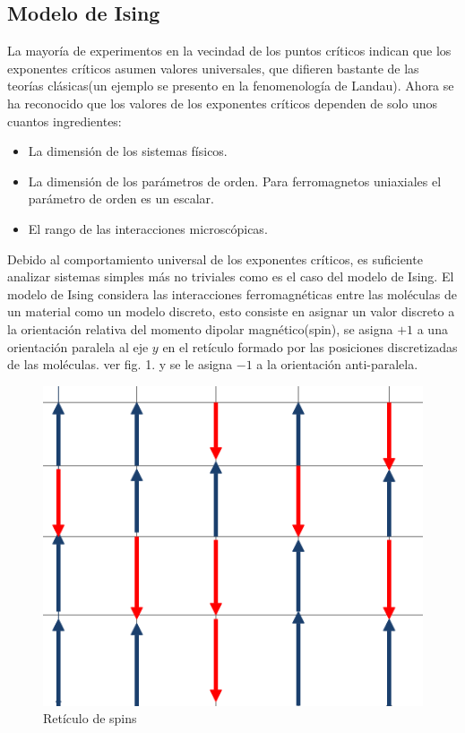 \documentclass[a4paper]{article}
\begin{document}
\subsection{Modelo de Ising}
La mayoría de experimentos en la vecindad de los puntos críticos indican que los exponentes críticos asumen valores universales, que difieren bastante de las teorías clásicas(un ejemplo se presento en la fenomenología de Landau). Ahora se ha reconocido que los valores de los exponentes críticos dependen de solo unos cuantos ingredientes:
\begin{itemize}
\item La dimensión de los sistemas físicos.
\item La dimensión de los parámetros de orden. Para ferromagnetos uniaxiales el parámetro de orden es un escalar.
\item El rango de las interacciones microscópicas.
\end{itemize}
Debido al comportamiento universal de los exponentes críticos, es suficiente analizar sistemas simples más no triviales como es el caso del modelo de Ising. El modelo de Ising considera las interacciones ferromagnéticas entre las moléculas de un material como un modelo discreto, esto consiste en asignar un valor discreto a la orientación relativa del momento dipolar magnético(spin), se asigna $+1$ a una orientación paralela al eje $y$ en el retículo formado por las posiciones discretizadas de las moléculas. ver fig. 1. y se le asigna $-1$ a la orientación anti-paralela. 

\begin{figure}[H]
\begin{center}
\includegraphics[scale=0.4]{LatticeIsing.png} 
\end{center} 
\caption{Retículo de spins}
\end{figure}
\end{document}

